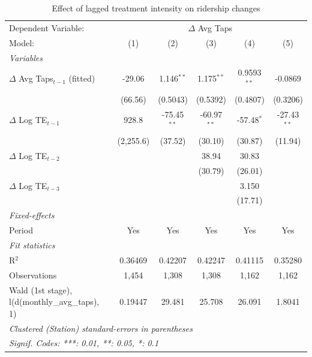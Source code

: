 
\begin{table}[htbp]
   \caption{\label{tab:behaviour_results_logs} Effect of lagged treatment intensity on ridership changes}
   \centering
   \footnotesize
   \begin{tabular}{lccccc}
      \tabularnewline \midrule \midrule
      Dependent Variable: & \multicolumn{5}{c}{$\Delta$ Avg Taps}\\
      Model:                                          & (1)       & (2)           & (3)           & (4)           & (5)\\  
      \midrule
      \emph{Variables}\\
      $\Delta$ Avg Taps$_{t-1}$ (fitted)              & -29.06    & 1.146$^{**}$  & 1.175$^{**}$  & 0.9593$^{**}$ & -0.0869\\   
                                                      & (66.56)   & (0.5043)      & (0.5392)      & (0.4807)      & (0.3206)\\   
      $\Delta$ Log TE$_{t-1}$                         & 928.8     & -75.45$^{**}$ & -60.97$^{**}$ & -57.48$^{*}$  & -27.43$^{**}$\\   
                                                      & (2,255.6) & (37.52)       & (30.10)       & (30.87)       & (11.94)\\   
      $\Delta$ Log TE$_{t-2}$                         &           &               & 38.94         & 30.83         &   \\   
                                                      &           &               & (30.79)       & (26.01)       &   \\   
      $\Delta$ Log TE$_{t-3}$                         &           &               &               & 3.150         &   \\   
                                                      &           &               &               & (17.71)       &   \\   
      \midrule
      \emph{Fixed-effects}\\
      Period                                          & Yes       & Yes           & Yes           & Yes           & Yes\\  
      \midrule
      \emph{Fit statistics}\\
      R$^2$                                           & 0.36469   & 0.42207       & 0.42247       & 0.41115       & 0.35280\\  
      Observations                                    & 1,454     & 1,308         & 1,308         & 1,162         & 1,162\\  
      Wald (1st stage), l(d(monthly\_avg\_taps), 1)   & 0.19447   & 29.481        & 25.708        & 26.091        & 1.8041\\  
      \midrule \midrule
      \multicolumn{6}{l}{\emph{Clustered (Station) standard-errors in parentheses}}\\
      \multicolumn{6}{l}{\emph{Signif. Codes: ***: 0.01, **: 0.05, *: 0.1}}\\
   \end{tabular}
\end{table}


